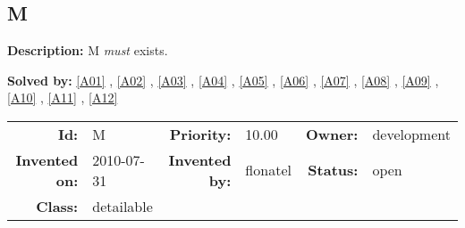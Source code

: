 \subsection{M}\label{M}
\textbf{Description:} M \textsl{must} exists.

\textbf{Solved by:} \ref{A01} , \ref{A02} , \ref{A03} , \ref{A04} , \ref{A05} , \ref{A06} , \ref{A07} , \ref{A08} , \ref{A09} , \ref{A10} , \ref{A11} , \ref{A12} 

\par
{\small \begin{center}\begin{tabular}{rlrlrl}
\textbf{Id:} & M  & \textbf{Priority:} & 10.00  & \textbf{Owner:} & development\\ 
\textbf{Invented on:} & 2010-07-31  & \textbf{Invented by:} & flonatel  & \textbf{Status:} & open \\ 
\textbf{Class:} & detailable  & & & \end{tabular}\end{center} }
